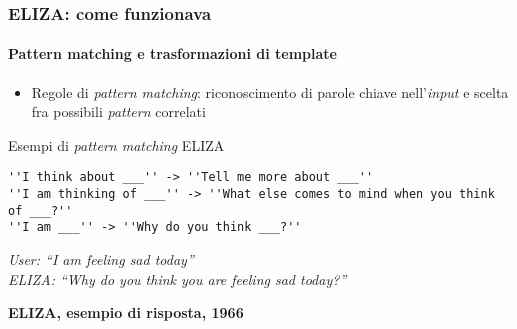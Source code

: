 %
\begin{frame}[t,fragile] \frametitle{ELIZA: come funzionava}
	{\small
		\onslide<1->
		\framesubtitle{Pattern matching e trasformazioni di template}
		\begin{itemize}[leftmargin=10pt,align=right]
			\item[\alert{\faHandORight}] \alert{Regole di \textit{pattern matching}:} riconoscimento di parole chiave nell'\textit{input} e scelta fra possibili \textit{pattern} correlati
		\end{itemize}
		\vspace*{.3cm}
		\begin{shellcodeblock}{Esempi di \textit{pattern matching} ELIZA}
        	\begin{verbatim}
''I think about ___'' -> ''Tell me more about ___''
''I am thinking of ___'' -> ''What else comes to mind when you think of ___?''
''I am ___'' -> ''Why do you think ___?''
        	\end{verbatim}
    	\end{shellcodeblock}
		\hspace*{4cm}
		\begin{minipage}[t]{.6\textwidth}
			\renewcommand{\epigraphsize}{\scriptsize}
			\setlength{\afterepigraphskip}{0pt}
			\setlength{\beforeepigraphskip}{5pt}
			\setlength{\epigraphwidth}{0.9\textwidth}
			\epigraph{\textit{\alert{User:} ``\alert{I am} feeling sad today''\\
			\alert{ELIZA:} ``Why do you think you are feeling sad today?''}}{\textbf{ELIZA, esempio di risposta, 1966}}
		\end{minipage}
	}
\end{frame}
%
